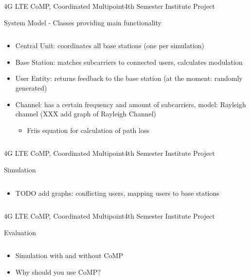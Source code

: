 \documentclass[xcolor={cmyk}]{beamer}
\begin{document}
 
  \begin{frame}{4G LTE CoMP, Coordinated Multipoint}{4th Semester Institute Project}
	 \begin{block}{System Model - Classes providing main functionality}
	 	\begin{columns}
			\begin{column}{.9\textwidth}
				\begin{itemize}
					\item Central Unit: coordinates all base stations (one per simulation)
					\item Base Station: matches subcarriers to connected users, calculates modulation
					
					\item User Entity: returns feedback to the base station (at the moment: randomly generated)
					\item Channel: has a certain frequency and amount of subcarriers, model: Rayleigh channel (XXX add graph of Rayleigh Channel)
					\begin{itemize}
						\item Friis equation for calculation of path loss
					\end{itemize}
				\end{itemize}
			\end{column}
		\end{columns}
	 \end{block}
 \end{frame}


 \begin{frame}{4G LTE CoMP, Coordinated Multipoint}{4th Semester Institute Project}
	 \begin{block}{Simulation}
	 	\begin{columns}
			\begin{column}{.9\textwidth}
				\begin{itemize}
					\item TODO add graphs: conflicting users, mapping users to base stations
				\end{itemize}
			\end{column}
		\end{columns}
	 \end{block}
 \end{frame}
 
 \begin{frame}{4G LTE CoMP, Coordinated Multipoint}{4th Semester Institute Project}
	 \begin{block}{Evaluation}
	 	\begin{columns}
			\begin{column}{.9\textwidth}
				\begin{itemize}
					\item Simulation with and without CoMP
					\item Why should you use CoMP?
				\end{itemize}
			\end{column}
		\end{columns}
	 \end{block}
 \end{frame}
 
\end{document}
